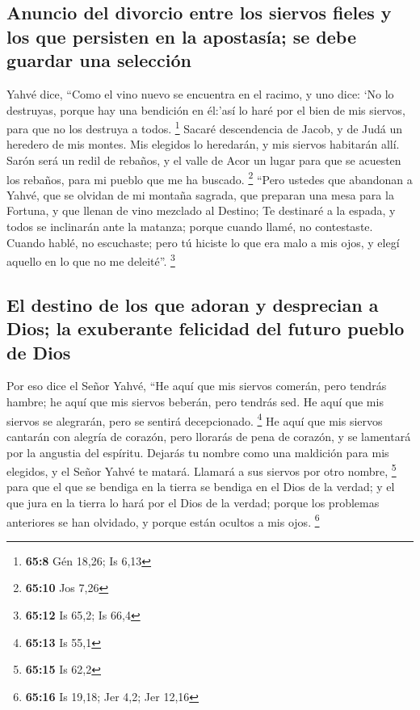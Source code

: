\hypertarget{anuncio-del-divorcio-entre-los-siervos-fieles-y-los-que-persisten-en-la-apostasuxeda-se-debe-guardar-una-selecciuxf3n}{%
\subsection{Anuncio del divorcio entre los siervos fieles y los que
persisten en la apostasía; se debe guardar una
selección}\label{anuncio-del-divorcio-entre-los-siervos-fieles-y-los-que-persisten-en-la-apostasuxeda-se-debe-guardar-una-selecciuxf3n}}

 Yahvé dice, ``Como el vino nuevo se encuentra en el
racimo, y uno dice: `No lo destruyas, porque hay una bendición en
él:'así lo haré por el bien de mis siervos, para que no los destruya a
todos. \footnote{\textbf{65:8} Gén 18,26; Is 6,13}  Sacaré
descendencia de Jacob, y de Judá un heredero de mis montes. Mis elegidos
lo heredarán, y mis siervos habitarán allí.  Sarón será
un redil de rebaños, y el valle de Acor un lugar para que se acuesten
los rebaños, para mi pueblo que me ha buscado. \footnote{\textbf{65:10}
  Jos 7,26}  ``Pero ustedes que abandonan a Yahvé, que se
olvidan de mi montaña sagrada, que preparan una mesa para la Fortuna, y
que llenan de vino mezclado al Destino;  Te destinaré a
la espada, y todos se inclinarán ante la matanza; porque cuando llamé,
no contestaste. Cuando hablé, no escuchaste; pero tú hiciste lo que era
malo a mis ojos, y elegí aquello en lo que no me deleité''. \footnote{\textbf{65:12}
  Is 65,2; Is 66,4}

\hypertarget{el-destino-de-los-que-adoran-y-desprecian-a-dios-la-exuberante-felicidad-del-futuro-pueblo-de-dios}{%
\subsection{El destino de los que adoran y desprecian a Dios; la
exuberante felicidad del futuro pueblo de
Dios}\label{el-destino-de-los-que-adoran-y-desprecian-a-dios-la-exuberante-felicidad-del-futuro-pueblo-de-dios}}

 Por eso dice el Señor Yahvé, ``He aquí que mis siervos
comerán, pero tendrás hambre; he aquí que mis siervos beberán, pero
tendrás sed. He aquí que mis siervos se alegrarán, pero se sentirá
decepcionado. \footnote{\textbf{65:13} Is 55,1}  He aquí
que mis siervos cantarán con alegría de corazón, pero llorarás de pena
de corazón, y se lamentará por la angustia del espíritu. 
Dejarás tu nombre como una maldición para mis elegidos, y el Señor Yahvé
te matará. Llamará a sus siervos por otro nombre, \footnote{\textbf{65:15}
  Is 62,2}  para que el que se bendiga en la tierra se
bendiga en el Dios de la verdad; y el que jura en la tierra lo hará por
el Dios de la verdad; porque los problemas anteriores se han olvidado, y
porque están ocultos a mis ojos. \footnote{\textbf{65:16} Is 19,18; Jer
  4,2; Jer 12,16}

